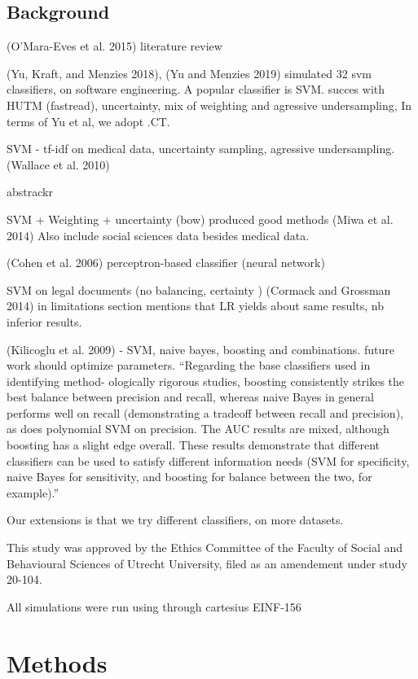 \documentclass[
]{article}
\begin{document}
\hypertarget{background}{%
\subsection{Background}\label{background}}

(O'Mara-Eves et al. 2015) literature review

(Yu, Kraft, and Menzies 2018), (Yu and Menzies 2019) simulated 32 svm
classifiers, on software engineering. A popular classifier is SVM.
succes with HUTM (fastread), uncertainty, mix of weighting and agressive
undersampling, In terms of Yu et al, we adopt .CT.

SVM - tf-idf on medical data, uncertainty sampling, agressive
undersampling. (Wallace et al. 2010)

abstrackr

SVM + Weighting + uncertainty (bow) produced good methods (Miwa et al.
2014) Also include social sciences data besides medical data.

(Cohen et al. 2006) perceptron-based classifier (neural network)

SVM on legal documents (no balancing, certainty ) (Cormack and Grossman
2014) in limitations section mentions that LR yields about same results,
nb inferior results.

(Kilicoglu et al. 2009) - SVM, naive bayes, boosting and combinations.
future work should optimize parameters. ``Regarding the base classifiers
used in identifying method- ologically rigorous studies, boosting
consistently strikes the best balance between precision and recall,
whereas naive Bayes in general performs well on recall (demonstrating a
tradeoff between recall and precision), as does polynomial SVM on
precision. The AUC results are mixed, although boosting has a slight
edge overall. These results demonstrate that different classifiers can
be used to satisfy different information needs (SVM for specificity,
naive Bayes for sensitivity, and boosting for balance between the two,
for example).''

Our extensions is that we try different classifiers, on more datasets.

This study was approved by the Ethics Committee of the Faculty of Social
and Behavioural Sciences of Utrecht University, filed as an amendement
under study 20-104.

All simulations were run using through cartesius EINF-156

\newpage

\hypertarget{methods-1}{%
\section{Methods}\label{methods-1}}
\end{document}
